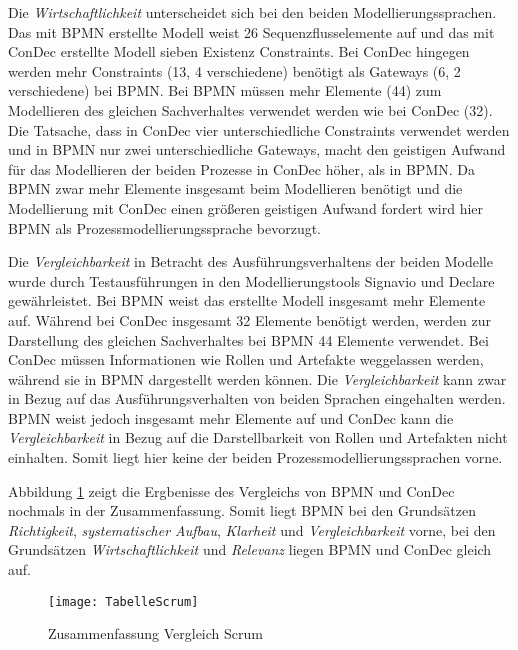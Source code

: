 Die \textit{Wirtschaftlichkeit} unterscheidet sich bei den beiden Modellierungssprachen. Das mit BPMN erstellte Modell weist 26 Sequenzflusselemente auf und das mit ConDec erstellte Modell sieben Existenz Constraints. Bei ConDec hingegen werden mehr Constraints (13, 4 verschiedene) benötigt als Gateways (6, 2 verschiedene) bei BPMN. Bei BPMN müssen mehr Elemente (44) zum Modellieren des gleichen Sachverhaltes verwendet werden wie bei ConDec (32).  Die Tatsache, dass in ConDec vier unterschiedliche Constraints verwendet werden und in BPMN nur zwei unterschiedliche Gateways, macht den geistigen Aufwand für das Modellieren der beiden Prozesse in ConDec höher, als in BPMN. \newline
Da BPMN zwar mehr Elemente insgesamt beim Modellieren benötigt und die Modellierung mit ConDec einen größeren geistigen Aufwand fordert wird hier BPMN als Prozessmodellierungssprache bevorzugt.\newline

Die \textit{Vergleichbarkeit} in Betracht des Ausführungsverhaltens der beiden Modelle wurde durch Testausführungen in den Modellierungstools Signavio und Declare gewährleistet.\newline
Bei BPMN weist das erstellte Modell insgesamt mehr Elemente auf. Während bei ConDec insgesamt 32 Elemente benötigt werden, werden zur Darstellung des gleichen Sachverhaltes bei BPMN 44 Elemente verwendet. \newline
Bei ConDec müssen Informationen wie Rollen und Artefakte weggelassen werden, während sie in BPMN dargestellt werden können.\newline
Die \textit{Vergleichbarkeit} kann zwar in Bezug auf das Ausführungsverhalten von beiden Sprachen eingehalten werden. BPMN weist jedoch insgesamt mehr Elemente auf und ConDec kann die \textit{Vergleichbarkeit} in Bezug auf die Darstellbarkeit von Rollen und Artefakten nicht einhalten. Somit liegt hier keine der beiden Prozessmodellierungssprachen vorne.\newline

Abbildung \ref{fig:TabelleScrum} zeigt die Ergbenisse des Vergleichs von BPMN und ConDec nochmals in der Zusammenfassung. Somit liegt BPMN bei den Grundsätzen \textit{Richtigkeit}, \textit{systematischer Aufbau}, \textit{Klarheit} und \textit{Vergleichbarkeit} vorne, bei den Grundsätzen \textit{Wirtschaftlichkeit} und \textit{Relevanz} liegen BPMN und ConDec gleich auf. \newline

\begin{figure}[htp]
\begin{center}
  \texttt{[image: TabelleScrum]} %
  \caption{Zusammenfassung Vergleich Scrum}
  \label{fig:TabelleScrum}
\end{center}
\end{figure}




